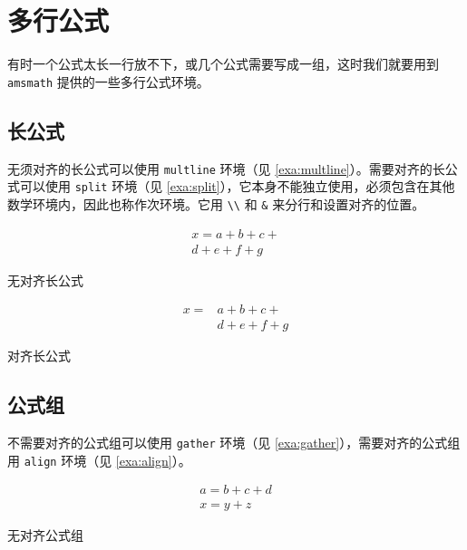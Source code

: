 \section{多行公式}

有时一个公式太长一行放不下，或几个公式需要写成一组，这时我们就要用到\texttt{amsmath} 提供的一些多行公式环境。

\subsection{长公式}
\label{sec:longeq}

无须对齐的长公式可以使用 \texttt{multline} 环境（见 \autoref{exa:multline}）。需要对齐的长公式可以使用 \texttt{split} 环境（见 \autoref{exa:split}），它本身不能独立使用，必须包含在其他数学环境内，因此也称作次环境。它用 \verb|\\| 和 \verb|&| 来分行和设置对齐的位置。

\begin{example}[htbp]
\begin{RLDemo}[]
\begin{multline}
x = a+b+c+{} \\
  d+e+f+g
\end{multline}
\end{RLDemo}
\caption{无对齐长公式}
\label{exa:multline}
\end{example}

\begin{example}[htbp]
\begin{RLDemo}[]
\[ \begin{split}
x ={} &a+b+c+{} \\
      &d+e+f+g
\end{split} \]
\end{RLDemo}
\caption{对齐长公式}
\label{exa:split}
\end{example}

\subsection{公式组}

不需要对齐的公式组可以使用 \texttt{gather} 环境（见 \autoref{exa:gather}），需要对齐的公式组用 \texttt{align} 环境（见 \autoref{exa:align}）。

\begin{example}[htbp]
\begin{RLDemo}[]
\begin{gather}
a = b+c+d \\
x = y+z
\end{gather}
\end{RLDemo}
\caption{无对齐公式组}
\label{exa:gather}
\end{example}

